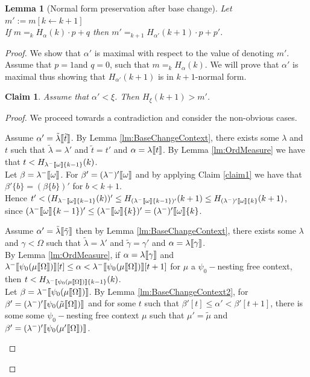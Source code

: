 \documentclass{amsart}
\theoremstyle{plain}
\theoremstyle{plain}
\newtheorem{lemma}[theorem]{Lemma}
\newtheorem{claim}[theorem]{Claim}
\def\scbrl{[\hspace{-.14em}[}
\def\scbrr{]\hspace{-.14em}]}
\def\scbr#1{\scbrl#1\scbrr}
\newcommand{\kp}{[k\leftarrow k+1]}
\newcommand{\Om}{{\Omega}}
\newcommand{\al}{{\alpha}}
\newcommand{\be}{{\beta}}
\newcommand{\ga}{\gamma}
\newcommand{\la}{\lambda}
\newcommand{\om}{\omega}
\def\scbrl{[\hspace{-.14em}[}
\def\scbrr{]\hspace{-.14em}]}
\def\scbr#1{\scbrl#1\scbrr}
\begin{document}
\begin{lemma}[Normal form preservation after base change]\label{lm:NFpreservBaseChange}
Let $m' := m\kp$\\
If $m=_{k} H_{\al}(k)\cdot p+ q$ then $m'=_{k+1} H_{\al'}(k+1) \cdot p+p'$.
\end{lemma}
\begin{proof}
We show that $\al'$ is maximal with respect to the value of denoting $m'$.
Assume that $p=1$and $q=0$, such that $m=_k H_{\al}(k)$. We will prove that $\al'$ is maximal thus showing that $H_{\al'}(k+1)$ is in $k+1$-normal form.\medskip
\begin{claim} 	Assume that $\al'<\xi$. Then $H_\xi(k+1)>m'$.
\end{claim} 
\begin{proof}
    We proceed towards a contradiction and consider the non-obvious cases. 
    \begin{Cases}
        \item Assume $\al'=\tilde{\la}\scbr{\tilde{t}}$. By Lemma \ref{lm:BaseChangeContext}, there exists some $\la$ and $t$ such that $\tilde{\la}=\la'$ and $\tilde{t}=t'$ and $\al=\la\scbr{t}$. 
        By Lemma \ref{lm:OrdMeasure} we have that $t<H_{\la^-\scbr{\om}\{k-1\}}(k)$.
        \\
        Let $\be= \la^-\scbr{\om}$. For $\be'=(\la^-)'\scbr{\om}$ and by  applying Claim \ref{claim1} we have that
        $\be'\{b\} =( \be\{b\})'$ for $b < k+1$.
        \medskip\\
        Hence $t'< (H_{\la^-\scbr{\om}\{k-1\}}(k))' \leq H_{(\la^-\scbr{\om}\{k-1\})'}(k+1)
        \leq  H_{(\la^-)'\scbr{\om}\{k\}}(k+1)$, \medskip
        \\since $(\la^-\scbr{\om}\{k-1\})' \leq (\la^-\scbr{\om}\{k\})' = (\la^-)'\scbr{\om}\{k\}$.
        \medskip
        \item Assume $\al'=\tilde{\la}\scbr{\tilde{\ga}}$ then by Lemma \ref{lm:BaseChangeContext}, there exists some $\la$ and $\ga<\Om$ such that $\tilde{\la}=\la'$ and $\tilde{\ga}=\ga'$ and $\al=\la\scbr{\ga}$.
        \medskip\\
        By Lemma \ref{lm:OrdMeasure}, if $\al=\la\scbr{\ga}$ and $\la^-\scbr{\psi_0(\mu\scbr{\Om})}[t]\leq \al<\la^-\scbr{\psi_0(\mu\scbr{\Om})}[t+1]$ for $\mu$ a $\psi_0-$nesting free context, then
        $t<H_{\la^-\scbr{\psi_0(\mu\scbr{\Om})}\{k-1\}}(k)$. 
        \medskip\\
        Let $\be = \la^-\scbr{\psi_0(\mu\scbr{\Om})}$. By Lemma \ref{lm:BaseChangeContext2}, for $\be' = (\la^-)'\scbr{\psi_0(\tilde{\mu}\scbr{\Om})}$ and for some $t$ such that $\be'[t]\leq\al'< \be'[t+1]$, there is some  some $\psi_0-$nesting free context $\mu$ such that $\mu'=\tilde{\mu}$ and $\be' = (\la^-)'\scbr{\psi_0(\mu'\scbr{\Om})}$.

\end{Cases}
\end{proof}
\end{proof}
\end{document}
